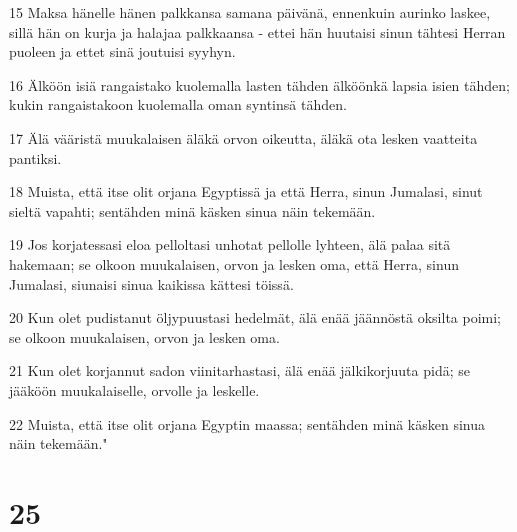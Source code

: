 \par 15 Maksa hänelle hänen palkkansa samana päivänä, ennenkuin aurinko laskee, sillä hän on kurja ja halajaa palkkaansa - ettei hän huutaisi sinun tähtesi Herran puoleen ja ettet sinä joutuisi syyhyn.
\par 16 Älköön isiä rangaistako kuolemalla lasten tähden älköönkä lapsia isien tähden; kukin rangaistakoon kuolemalla oman syntinsä tähden.
\par 17 Älä vääristä muukalaisen äläkä orvon oikeutta, äläkä ota lesken vaatteita pantiksi.
\par 18 Muista, että itse olit orjana Egyptissä ja että Herra, sinun Jumalasi, sinut sieltä vapahti; sentähden minä käsken sinua näin tekemään.
\par 19 Jos korjatessasi eloa pelloltasi unhotat pellolle lyhteen, älä palaa sitä hakemaan; se olkoon muukalaisen, orvon ja lesken oma, että Herra, sinun Jumalasi, siunaisi sinua kaikissa kättesi töissä.
\par 20 Kun olet pudistanut öljypuustasi hedelmät, älä enää jäännöstä oksilta poimi; se olkoon muukalaisen, orvon ja lesken oma.
\par 21 Kun olet korjannut sadon viinitarhastasi, älä enää jälkikorjuuta pidä; se jääköön muukalaiselle, orvolle ja leskelle.
\par 22 Muista, että itse olit orjana Egyptin maassa; sentähden minä käsken sinua näin tekemään."

\chapter{25}

